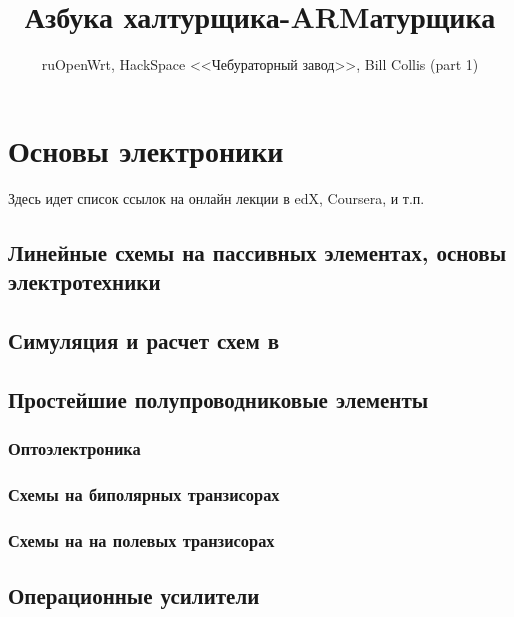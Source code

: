 

\title{Азбука халтурщика-ARMатурщика}
\author{ruOpenWrt, HackSpace <<Чебураторный завод>>, Bill Collis (part 1)}



\tableofcontents\clearpage





\part{Основы электроники}

Здесь идет список ссылок на онлайн лекции в edX, Coursera, и т.п.

\chapter{Линейные схемы на пассивных элементах, основы электротехники}

\chapter{Симуляция и расчет схем в \spice}



\chapter{Простейшие полупроводниковые элементы}

\section{Оптоэлектроника}

\section{Схемы на биполярных транзисорах} 

\section{Схемы на на полевых транзисорах}

\chapter{Операционные усилители}

